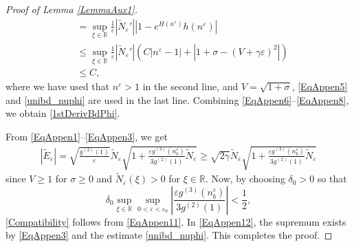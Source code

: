 \documentclass{amsart}
\newcommand{\veps}{\varepsilon}
\numberwithin{equation}{section}
\theoremstyle{plain}%
\theoremstyle{definition}
\theoremstyle{remark}
\theoremstyle{remark}
\begin{document}
\begin{proof}[Proof of Lemma \ref{LemmaAux1}]
\begin{equation}
\begin{split}
& =\sup_{\xi \in \mathbb{R}} \frac{1}{\veps} | \widetilde{N}_\veps'||1 - e^{H(n^\veps)}h(n^\veps)|  \\
& \leq \sup_{\xi \in \mathbb{R}} \frac{1}{\veps} | \widetilde{N}_\veps'| \left( C | n^\veps-1| + |1+\sigma-(V+\gamma\veps)^2| \right) \\
& \leq C,
\end{split}
\end{equation}
where we have used that $n^\veps>1$ in the second line, and $V=\sqrt{1+\sigma}$, \eqref{EqAppen5} and \eqref{unibd_nuphi} are used in the last line. Combining \eqref{EqAppen6}--\eqref{EqAppen8}, we obtain \eqref{1stDerivBdPhi}. 

From \eqref{EqAppen1}--\eqref{EqAppen3}, we get
\begin{equation}\label{EqAppen11}
\begin{split}
|\widetilde{E}_\veps|
 = \sqrt{\frac{g^{(2)}(1)}{\veps}}\widetilde{N}_\veps\sqrt{1 + \frac{\veps g^{(3)}(n_b^\veps)}{3g^{(2)}(1)}\widetilde{N}_\veps}  \geq  \sqrt{2\gamma}\widetilde{N}_\veps\sqrt{1 + \frac{\veps g^{(3)}(n_b^\veps)}{3g^{(2)}(1)}\widetilde{N}_\veps}
\end{split}
\end{equation}
since $V\geq 1$ for $\sigma \geq 0$ and $\widetilde{N}_\veps(\xi)>0$ for $\xi \in \mathbb{R}$. Now, by choosing $\delta_0>0$ so that 
\begin{equation}\label{EqAppen12}
\delta_0\sup_{\xi \in \mathbb{R}}\sup_{0<\veps<\veps_0}\left|\frac{\veps g^{(3)}(n_b^\veps)}{3g^{(2)}(1)} \right| <\frac{1}{2},
\end{equation}
\eqref{Compatibility} follows from \eqref{EqAppen11}. In \eqref{EqAppen12}, the supremum exists by \eqref{EqAppen3} and the estimate \eqref{unibd_nuphi}.
This completes the proof.
\end{proof}
\end{document}
